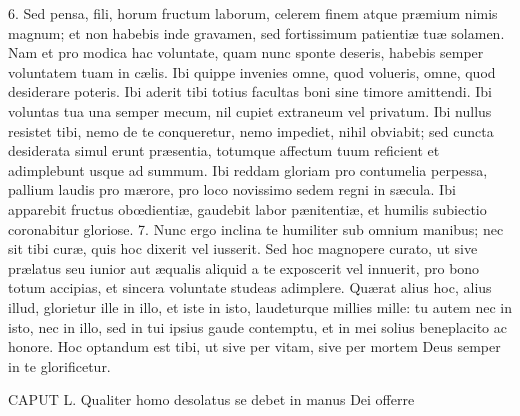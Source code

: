 \documentclass[twoside]{article}
\begin{document}
6. Sed pensa, fili, horum fructum laborum, celerem finem atque præmium nimis magnum; et non habebis inde gravamen, sed fortissimum patientiæ tuæ solamen. Nam et pro modica hac voluntate, quam nunc sponte deseris, habebis semper voluntatem tuam in cælis. Ibi quippe invenies omne, quod volueris, omne, quod desiderare poteris. Ibi aderit tibi totius facultas boni sine timore amittendi. Ibi voluntas tua una semper mecum, nil cupiet extraneum vel privatum. Ibi nullus resistet tibi, nemo de te conqueretur, nemo impediet, nihil obviabit; sed cuncta desiderata simul erunt præsentia, totumque affectum tuum reficient et adimplebunt usque ad summum. Ibi reddam gloriam pro contumelia perpessa, pallium laudis pro mærore, pro loco novissimo sedem regni in sæcula. Ibi apparebit fructus obœdientiæ, gaudebit labor pænitentiæ, et humilis subiectio coronabitur gloriose.
7. Nunc ergo inclina te humiliter sub omnium manibus; nec sit tibi curæ, quis hoc dixerit vel iusserit. Sed hoc magnopere curato, ut sive prælatus seu iunior aut æqualis aliquid a te exposcerit vel innuerit, pro bono totum accipias, et sincera voluntate studeas adimplere. Quærat alius hoc, alius illud, glorietur ille in illo, et iste in isto, laudeturque millies mille: tu autem nec in isto, nec in illo, sed in tui ipsius gaude contemptu, et in mei solius beneplacito ac honore. Hoc optandum est tibi, ut sive per vitam, sive per mortem Deus semper in te glorificetur.


CAPUT L.
Qualiter homo desolatus se debet in manus Dei offerre
\end{document}
